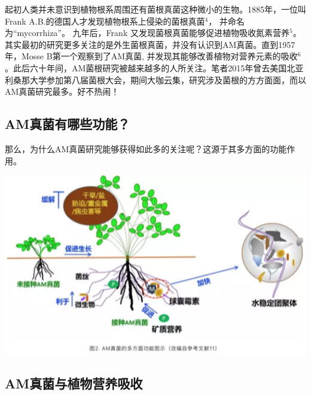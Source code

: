 \documentclass[
]{book}
\begin{document}
起初人类并未意识到植物根系周围还有菌根真菌这种微小的生物。1885年，一位叫Frank A.B.的德国人才发现植物根系上侵染的菌根真菌\(^4\)， 并命名为``mycorrhiza''。 九年后，Frank 又发现菌根真菌能够促进植物吸收氮素营养\(^5\)。其实最初的研究更多关注的是外生菌根真菌，并没有认识到AM真菌。直到1957年，Mosse B第一个观察到了AM真菌, 并发现其能够改善植物对营养元素的吸收\(^6\)。此后六十年间，AM菌根研究被越来越多的人所关注。笔者2015年曾去美国北亚利桑那大学参加第八届菌根大会，期间大咖云集，研究涉及菌根的方方面面，而以AM真菌研究最多。好不热闹！

\hypertarget{amux771fux83ccux6709ux54eaux4e9bux529fux80fd}{%
\subsection{AM真菌有哪些功能？}\label{amux771fux83ccux6709ux54eaux4e9bux529fux80fd}}

那么，为什么AM真菌研究能够获得如此多的关注呢？这源于其多方面的功能作用。

\includegraphics[width=6.67in]{images/am2}

\hypertarget{amux771fux83ccux4e0eux690dux7269ux8425ux517bux5438ux6536}{%
\subsection{AM真菌与植物营养吸收}\label{amux771fux83ccux4e0eux690dux7269ux8425ux517bux5438ux6536}}
\end{document}
